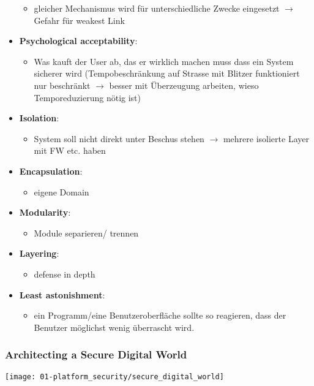 \begin{itemize}
    \begin{itemize}
        \item gleicher Mechanismus wird für unterschiedliche Zwecke eingesetzt $\rightarrow$ Gefahr für weakest Link
    \end{itemize}
    \item \textbf{Psychological acceptability}: 
    \begin{itemize}
        \item Was kauft der User ab, das er wirklich machen muss dass ein System sicherer wird (Tempobeschränkung auf Strasse mit Blitzer funktioniert nur beschränkt $\rightarrow$ besser mit Überzeugung arbeiten, wieso Temporeduzierung nötig ist)
    \end{itemize}
    \item \textbf{Isolation}: 
    \begin{itemize}
        \item System soll nicht direkt unter Beschus stehen $\rightarrow$ mehrere isolierte Layer mit FW etc. haben
    \end{itemize}
    \item \textbf{Encapsulation}: 
    \begin{itemize}
        \item eigene Domain
    \end{itemize}
    \item \textbf{Modularity}: 
    \begin{itemize}
        \item Module separieren/ trennen
    \end{itemize}
    \item \textbf{Layering}: 
    \begin{itemize}
        \item defense in depth
    \end{itemize}
    \item \textbf{Least astonishment}: 
    \begin{itemize}
        \item ein Programm/eine Benutzeroberfläche sollte so reagieren, dass der Benutzer möglichst wenig überrascht wird.
    \end{itemize}
\end{itemize}

\subsubsection{Architecting a Secure Digital World}
\begin{center}
    \vspace{-8pt}
    \texttt{[image: 01-platform\_security/secure\_digital\_world]}
    \vspace{-8pt}
\end{center}

